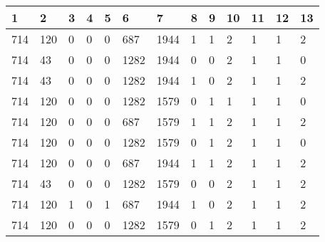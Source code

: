\begin{table}[H]
\begin{tabular}{|l|l|l|l|l|l|l|l|l|l|l|l|l|}
\hline
\textbf{1} & \textbf{2} & \textbf{3} & \textbf{4} & \textbf{5} & \textbf{6} & \textbf{7} & \textbf{8} & \textbf{9} & \textbf{10} & \textbf{11} & \textbf{12} & \textbf{13} \\ \hline
714  &  120  &  0  &  0  &  0  &  687  &  1944  &  1  &  1  &  2  &  1  &  1  &  2 \\ \hline
714  &  43  &  0  &  0  &  0  &  1282  &  1944  &  0  &  0  &  2  &  1  &  1  &  0 \\ \hline
714  &  43  &  0  &  0  &  0  &  1282  &  1944  &  1  &  0  &  2  &  1  &  1  &  2 \\ \hline
714  &  120  &  0  &  0  &  0  &  1282  &  1579  &  0  &  1  &  1  &  1  &  1  &  0 \\ \hline
714  &  120  &  0  &  0  &  0  &  687  &  1579  &  1  &  1  &  2  &  1  &  1  &  2 \\ \hline
714  &  120  &  0  &  0  &  0  &  1282  &  1579  &  0  &  1  &  2  &  1  &  1  &  0 \\ \hline
714  &  120  &  0  &  0  &  0  &  687  &  1944  &  1  &  1  &  2  &  1  &  1  &  2 \\ \hline
714  &  43  &  0  &  0  &  0  &  1282  &  1579  &  0  &  0  &  2  &  1  &  1  &  2 \\ \hline
714  &  120  &  1  &  0  &  1  &  687  &  1944  &  1  &  0  &  2  &  1  &  1  &  2 \\ \hline
714  &  120  &  0  &  0  &  0  &  1282  &  1579  &  0  &  1  &  2  &  1  &  1  &  2 \\ \hline
\end{tabular}
\end{table}

